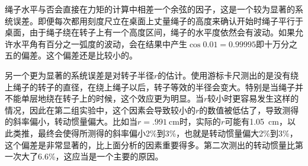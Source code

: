 \documentclass[UTF8]{ctexart}
\begin{document}
绳子水平与否会直接在力矩的计算中相差一个余弦的因子，这是一个较为显著的系统误差。即便每次都用刻度尺立在桌面上丈量绳子的高度来确认开始时绳子平行于桌面，由于绳子绕在转子上有一个高度区间，绳子的水平度依然会有波动。如果允许水平角有百分之一弧度的波动，会在结果中产生$\cos 0.01=0.99995$即十万分之五的偏差。这个偏差还是比较小的。

另一个更为显著的系统误差是对转子半径$r$的估计。使用游标卡尺测出的是没有绕上绳子的转子的直径，在绕上绳子以后，转子等效的半径会变大。特别是当绳子并不能单层地绕在转子上的时候，这个效应更为明显。当$r$较小时更容易发生这样的情况，因此在第二组实验中，这个因素会导致较小的$r$的数值被低估了，导致测得的斜率偏小，转动惯量偏大。比如当$r=\SI{.991}{\cm}$时，实际的$r$可能有\SI{1.05}{\cm}，以此类推，最终会使得所测得的斜率偏小2\%到3\%，也就是转动惯量偏大2\%到3\%，这个偏差是非常显著的，比上面分析的因素重要得多。第二次测出的转动惯量比第一次大了6.6\%，这应当是一个主要的原因。
\begin{figure}
\centering
{}
 \\
 \\
\end{figure}
\end{document}
